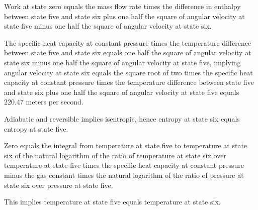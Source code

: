 Work at state zero equals the mass flow rate times the difference in enthalpy between state five and state six plus one half the square of angular velocity at state five minus one half the square of angular velocity at state six.

The specific heat capacity at constant pressure times the temperature difference between state five and state six equals one half the square of angular velocity at state six minus one half the square of angular velocity at state five, implying angular velocity at state six equals the square root of two times the specific heat capacity at constant pressure times the temperature difference between state five and state six plus one half the square of angular velocity at state five equals 220.47 meters per second.

Adiabatic and reversible implies isentropic, hence entropy at state six equals entropy at state five.

Zero equals the integral from temperature at state five to temperature at state six of the natural logarithm of the ratio of temperature at state six over temperature at state five times the specific heat capacity at constant pressure minus the gas constant times the natural logarithm of the ratio of pressure at state six over pressure at state five.

This implies temperature at state five equals temperature at state six.